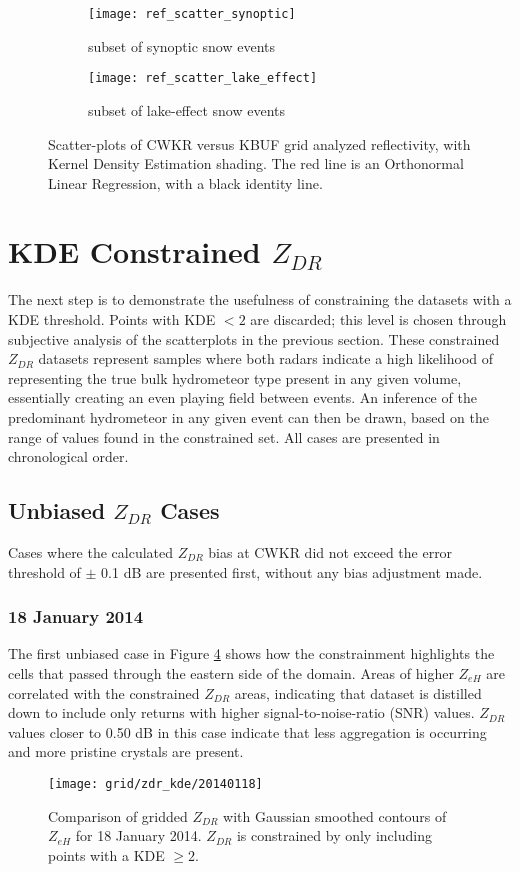 \begin{figure}[H]
\centering
   \begin{subfigure}{0.49\linewidth} \centering
     \texttt{[image: ref\_scatter\_synoptic]}
     \caption{subset of synoptic snow events}\label{fig:ref_synoptic}
   \end{subfigure}
   \begin{subfigure}{0.49\linewidth} \centering
     \texttt{[image: ref\_scatter\_lake\_effect]}
     \caption{subset of lake-effect snow events}\label{fig:ref_lake_effect}
   \end{subfigure}
\caption{Scatter-plots of CWKR versus KBUF grid analyzed reflectivity, with Kernel Density Estimation shading. The red line is an Orthonormal Linear
Regression, with a black identity line.} \label{fig:ref_scatter}
\end{figure}

\section{KDE Constrained $Z_{DR}$}
The next step is to demonstrate the usefulness of constraining the datasets with a KDE threshold. Points with KDE $< 2$ are discarded; this level is chosen
through subjective analysis of the scatterplots in the previous section. These constrained $Z_{DR}$ datasets represent samples where both radars indicate a
high likelihood of representing the true bulk hydrometeor type present in any given volume, essentially creating an even playing field between events. An
inference of the predominant hydrometeor in any given event can then be drawn, based on the range of values found in the constrained set. All cases are
presented in chronological order.
\subsection{Unbiased $Z_{DR}$ Cases}
Cases where the calculated $Z_{DR}$ bias at CWKR did not exceed the error threshold of $\pm$ 0.1 dB are presented first, without any bias adjustment made.
\subsubsection{18 January 2014}
The first unbiased case in Figure \ref{fig:grid_zdr_kde_20140118} shows how the constrainment highlights the cells that passed through the eastern side of
the domain. Areas of higher $Z_{eH}$  are correlated with the constrained $Z_{DR}$ areas, indicating that dataset is distilled down to include only returns
with higher signal-to-noise-ratio (SNR) values. $Z_{DR}$ values closer to 0.50 dB in this case indicate that less aggregation is occurring and more pristine
crystals are present.
\begin{figure}[H]
\texttt{[image: grid/zdr\_kde/20140118]}
\caption{Comparison of gridded $Z_{DR}$ with Gaussian smoothed contours of $Z_{eH}$ for 18 January 2014. $Z_{DR}$ is constrained by only including points
with a KDE $\geq 2$.}
\label{fig:grid_zdr_kde_20140118}
\end{figure}
